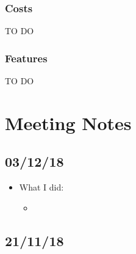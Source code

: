 \documentclass[11pt,a4paper]{report}
\begin{document}
\subsection{Costs}
\label{subsec:costs}

TO DO


\subsection{Features}
\label{subsec:features}

TO DO


\chapter{Meeting Notes}

\section{03/12/18}

\begin{itemize}

\item What I did:
  \begin{itemize}
  \item
  \end{itemize}

\end{itemize}

\section{21/11/18}
\end{document}
